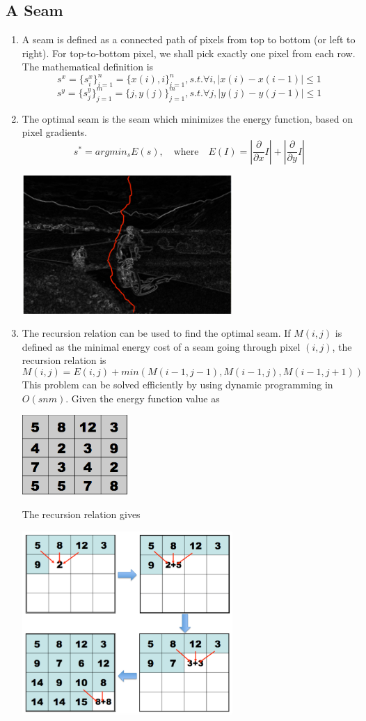 \documentclass{article}
\begin{document}
\subsection{A Seam}
\begin{enumerate}
\item A seam is defined as a connected path of pixels from top to bottom (or left to right). For top-to-bottom pixel, we shall pick exactly one pixel from each row. The mathematical definition is
$$
s^x = \{s_i^x\}_{i=1}^n = \{x(i),i\}_{i=1}^n, s.t. \forall i, |x(i) - x(i - 1)| \leq 1
$$
$$
s^y = \{s_j^y\}_{j=1}^m = \{j,y(j)\}_{j=1}^m, s.t. \forall j, |y(j) - y(j - 1)| \leq 1
$$
\item The optimal seam is the seam which minimizes the energy function, based on pixel gradients.
$$
s^{*} = argmin_s E(s), \quad \textrm{where} \quad E(I) = |\frac{\partial}{\partial x}I| + |\frac{\partial}{\partial y}I|
$$
\begin{center}
\includegraphics[width=8cm]{Optimal_Seam.png}
\end{center}
\item The recursion relation can be used to find the optimal seam. If $M(i,j)$ is defined as the minimal energy cost of a seam going through pixel $(i,j)$, the recursion relation is
$$
M(i,j) = E(i,j) + min(M(i-1,j-1), M(i-1,j), M(i-1,j+1))
$$
This problem can be solved efficiently by using dynamic programming in $O(snm)$.
Given the energy function value as
\begin{center}
\includegraphics[width=4cm]{energy.png}
\end{center}
The recursion relation gives
\begin{center}
\includegraphics[width=8cm]{findseam1.png}

\end{center}
\end{enumerate}
\end{document}
